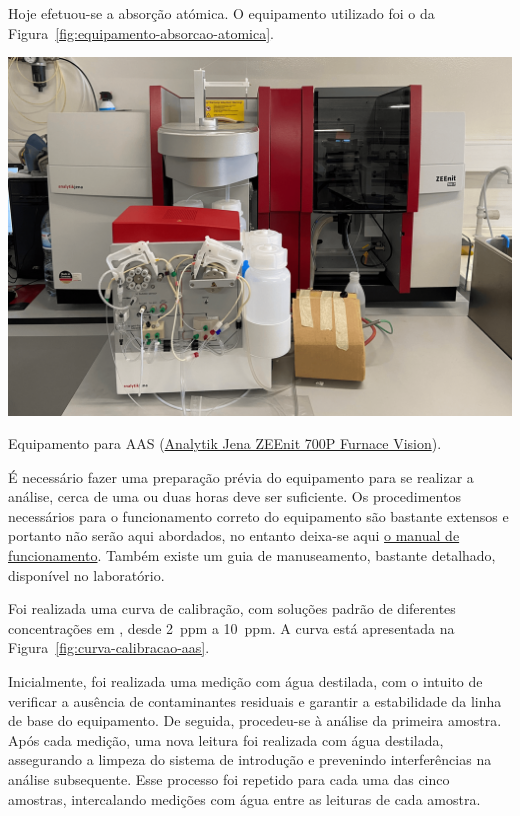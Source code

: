 \hrulefill


Hoje efetuou-se a absorção atómica.
O equipamento utilizado foi o da Figura~\ref{fig:equipamento-absorcao-atomica}.

\begin{marginfigure}[8\baselineskip]
    \centering
    \includegraphics[width=0.95\linewidth]{figures/Absorção atómica}
    \caption{Equipamento para AAS (\href{https://www.analytik-jena.com/products/chemical-analysis/elemental-analysis/aas/zeenit-series/}{Analytik Jena ZEEnit 700P Furnace Vision}).}
    \label{fig:equipamento-absorcao-atomica}
\end{marginfigure}

É necessário fazer uma preparação prévia do equipamento para se realizar a análise, cerca de uma ou duas horas deve ser suficiente.
Os procedimentos necessários para o funcionamento correto do equipamento são bastante extensos e portanto não serão aqui abordados, no entanto deixa-se aqui \href{https://www.analytik-jena.com/fileadmin/import/assets/0000006182_Manual_ZEEnit_700_P_en.pdf}{o manual de funcionamento}.
Também existe um guia de manuseamento, bastante detalhado, disponível no laboratório.

Foi realizada uma curva de calibração, com soluções padrão de diferentes concentrações em , desde 2~ppm a 10~ppm.
A curva está apresentada na Figura~\ref{fig:curva-calibracao-aas}.



Inicialmente, foi realizada uma medição com água destilada, com o intuito de verificar a ausência de contaminantes residuais e garantir a estabilidade da linha de base do equipamento.
De seguida, procedeu-se à análise da primeira amostra.
Após cada medição, uma nova leitura foi realizada com água destilada, assegurando a limpeza do sistema de introdução e prevenindo interferências na análise subsequente.
Esse processo foi repetido para cada uma das cinco amostras, intercalando medições com água entre as leituras de cada amostra.

